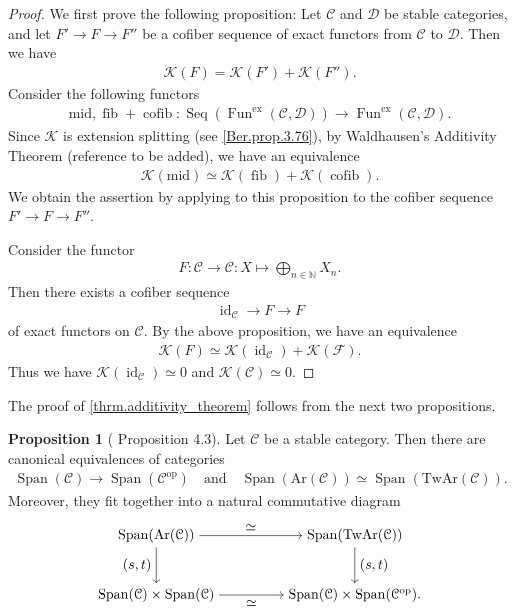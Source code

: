 \documentclass[a4paper,dvipdfmx,11pt,reqno]{amsart}
\DeclareMathOperator{\myop}{op}
\DeclareMathOperator{\id}{id}
\DeclareMathOperator{\fib}{fib}
\DeclareMathOperator{\cofib}{cofib}
\renewcommand{\mid}{\mathrm{mid}}
\DeclareMathOperator{\Fun}{Fun}
\newcommand{\C}{\mathcal{C}}
\newcommand{\D}{\mathcal{D}}
\newcommand{\F}{\mathcal{F}}
\newcommand{\K}{\mathcal{K}}
\DeclareMathOperator{\Seq}{Seq}
\DeclareMathOperator{\Span}{Span}
\newcommand{\Ar}{\mathrm{Ar}}
\newcommand{\TwAr}{\mathrm{TwAr}}
\theoremstyle{definition}
\newtheorem{proposition}[theorem]{Proposition}
\begin{document}
\begin{proof}
  We first prove the following proposition:
  Let $\C$ and $\D$ be stable categories, and let $F' \to F \to F''$ be a cofiber sequence of exact functors from $\C$ to $\D$.
  Then we have 
  \begin{align*}
    \K(F) = \K(F') + \K(F'').
  \end{align*}
  Consider the following functors 
  \begin{align*}
    \mid, \fib+\cofib : \Seq(\Fun^{\mathrm{ex}}(\C,\D)) \to \Fun^{\mathrm{ex}}(\C,\D).
  \end{align*}
  Since $\K$ is extension splitting (see \cref{Ber.prop.3.76}), by Waldhausen's Additivity Theorem (reference to be added), we have an equivalence %
  \begin{align*}
    \K(\mid) \simeq \K(\fib) + \K(\cofib).
  \end{align*}
  We obtain the assertion by applying to this proposition to the cofiber sequence $F' \to F \to F''$.

  Consider the functor
  \begin{align*}
    F : \C \to \C : X \mapsto \bigoplus_{n \in \mathbb{N}} X_n .
  \end{align*}
  Then there exists a cofiber sequence 
  \begin{align*}
    \id_{\C} \to F \to F
  \end{align*}
  of exact functors on $\C$.
  By the above proposition, we have an equivalence 
  \begin{align*}
    \K(F) \simeq \K(\id_{\C}) + \K(\F). 
  \end{align*}
  Thus we have $\K(\id_{\C}) \simeq 0$ and $\K(\C) \simeq 0$.
\end{proof}

The proof of \cref{thrm.additivity_theorem} follows from the next two propositions.

\begin{proposition}[\cite{HLS23} Proposition 4.3] \label{HLS23.prop.4.3}
  Let $\C$ be a stable category.
  Then there are canonical equivalences of categories
  \begin{align*}
    \Span(\C) \to \Span(\C^{\myop}) \quad \text{and} \quad \Span(\Ar(\C)) \simeq \Span(\TwAr(\C)).
  \end{align*}
  Moreover, they fit together into a natural commutative diagram 
  \[\begin{tikzpicture}[auto,->] 
    \node (tl) at (0,1.5) {$\Span(\Ar(\C))$}; 
    \node (tr) at (5,1.5) {$\Span(\TwAr(\C))$};
    \node (bl) at (0,0) {$\Span(\C) \times \Span(\C)$}; 
    \node (br) at (5,0) {$\Span(\C) \times \Span(\C^{\myop}).$}; 
    \draw (tl) -- node {$\simeq$} (tr); 
    \draw (bl) -- node[swap] {$\simeq$} (br); 
    \draw (tl) -- node[swap] {$(s,t)$} (bl);
    \draw (tr) -- node {$(s,t)$} (br); 
  \end{tikzpicture}\]
\end{proposition}
\end{document}
